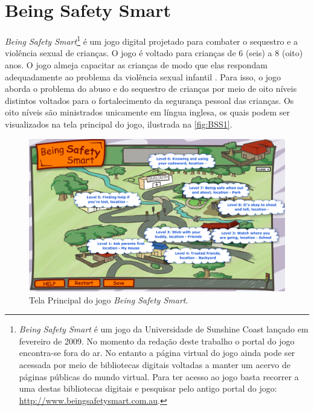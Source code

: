 
\section{Being Safety Smart}\label{sssec:Being}

\textit{Being Safety Smart}\footnote{\textit{Being Safety Smart} é um jogo  da Universidade de Sunshine Coast lançado em fevereiro de 2009. No momento da redação deste trabalho o portal do jogo encontra-se fora do ar. No entanto a página virtual do jogo ainda pode ser acessada por meio de bibliotecas digitais voltadas a manter um acervo de páginas públicas do mundo virtual. Para ter acesso ao jogo basta recorrer a uma destas bibliotecas digitais e pesquisar pelo antigo portal do jogo: \url{http://www.beingsafetysmart.com.au}.} é um jogo digital projetado para combater o sequestro e a violência sexual de crianças. O jogo é voltado para crianças de 6 (seis) a 8 (oito) anos. O jogo almeja capacitar as crianças de modo que elas respondam adequadamente ao problema da violência sexual infantil \cite{jones2008online}. Para isso, o jogo aborda o problema do abuso e do sequestro de crianças por meio de oito níveis distintos voltados para o fortalecimento da segurança pessoal das crianças. Os oito níveis são ministrados unicamente em língua inglesa, os quais podem ser visualizados na tela principal do jogo, ilustrada na \autoref{fig:BSS1}. 

\begin{figure}[htb]
	\caption{\label{fig:BSS1}Tela Principal do jogo \textit{Being Safety Smart}.}
  \begin{center}\vspace{-0.3cm}
    \includegraphics[width=\linewidth]{./Visuais/BSS/B1.png}
	\end{center}\vspace{-0.2cm}
\end{figure}

